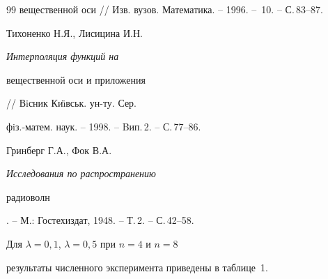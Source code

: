 \begin{thebibliography}{99}
{вещественной оси} // Изв. вузов. Математика. -- 1996. -- \No\,10. -- С.\,83--87. 




Тихоненко Н.Я., Лисицина И.Н. {\em Интерполяция функций на


вещественной оси и приложения} // Вiсник Ки\"{\i}вськ. ун-ту. Сер.


фiз.-матем. наук. -- 1998. -- Bип.\,2. -- С.\,77--86. 




Гринберг Г.А., Фок В.А. {\em Исследования по распространению


радиоволн}. -- М.: Гостехиздат, 1948. -- Т.\,2. -- С.\,42--58.  








\end{thebibliography}





\vskip 2cm












\label{end}























Для $\lambda=0,1$, $\lambda=0,5$ при $n=4$ и $n=8$


результаты численного эксперимента приведены в таблице \No\,1.  


$$


